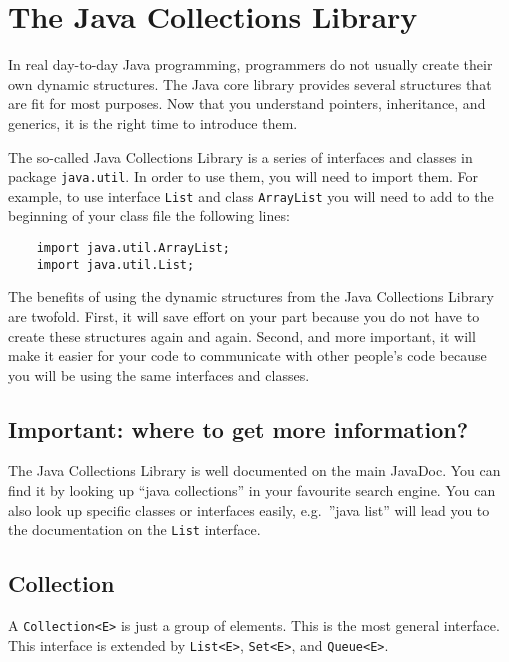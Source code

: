 
\section{The Java Collections Library}
\label{sec:java-coll-libr}

In real day-to-day Java programming, programmers do not usually create
their own dynamic structures. The Java core library provides several
structures that are fit for most purposes. Now that you understand
pointers, inheritance, and generics, it is the right time to introduce
them.

The so-called Java Collections Library is a series of interfaces and
classes in package \verb+java.util+. In order to use them, you will
need to import them. For example, to use interface \verb+List+ and
class \verb+ArrayList+ you will need to add to the beginning of your
class file the following lines:

\begin{verbatim}
    import java.util.ArrayList;
    import java.util.List;
\end{verbatim}

The benefits of using the dynamic structures from the Java Collections
Library are twofold. First, it will
save effort on your part because you do not have to create these
structures again and again. Second, and more important, it will make
it easier for your code to 
communicate with other people's code because you will be using the same
interfaces and classes. 

\subsection*{Important: where to get more information?}
\label{sec:important:-where-get}

The Java Collections Library is well documented on the main
JavaDoc. You can find it by looking up ``java collections'' in your
favourite search engine. You can also look up specific classes or
interfaces easily, e.g.~''java list'' will lead you to the
documentation on the \verb+List+ interface. 

\subsection{Collection}
\label{sec:collection}

A \verb+Collection<E>+ is just a group of elements. This is the most
general interface. This interface is extended by \verb+List<E>+,
\verb+Set<E>+, and \verb+Queue<E>+. 

